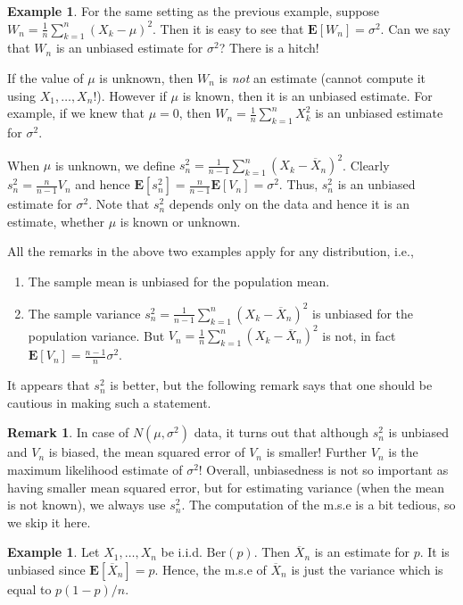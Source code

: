 \documentclass[preprint,  11pt]{amsart}
\theoremstyle{plain} %
\theoremstyle{definition} %
\newtheorem{remark}[theorem]{Remark}
\newtheorem{example}[theorem]{Example}
\begin{document}
\begin{example} For the same setting as the previous example, suppose $W_{n}=\frac{1}{n}\sum_{k=1}^{n}(X_{k}-\mu)^{2}$. Then it is easy to see that $\mathbf{E}[W_{n}]={\sigma}^{2}$. Can we say that $W_{n}$ is an unbiased estimate for ${\sigma}^{2}$? There is a hitch!

If the value of $\mu$ is unknown, then $W_{n}$ is {\em not} an estimate (cannot compute it using $X_{1},\ldots ,X_{n}$!). However if $\mu$ is known, then it is an unbiased estimate. For example, if we knew that $\mu=0$, then $W_{n}=\frac{1}{n}\sum_{k=1}^{n}X_{k}^{2}$ is an unbiased estimate for ${\sigma}^{2}$. 

When $\mu$ is unknown, we define $s_{n}^{2}=\frac{1}{n-1}\sum_{k=1}^{n}(X_{k}-\overline{X}_{n})^{2}$. Clearly $s_{n}^{2}=\frac{n}{n-1}V_{n}$ and hence $\mathbf{E}[s_{n}^{2}]=\frac{n}{n-1}\mathbf{E}[V_{n}]= {\sigma}^{2}$. Thus, $s_{n}^{2}$ is an unbiased estimate for ${\sigma}^{2}$. Note that $s_{n}^{2}$ depends only on the data and hence it is an estimate, whether $\mu$ is known or unknown.
\end{example}
All the remarks in the above two examples apply for any distribution, i.e., 
\begin{enumerate}\setlength\itemsep{6pt}
\item The sample mean is unbiased for the population mean.
\item The sample variance $s_{n}^{2}=\frac{1}{n-1}\sum_{k=1}^{n}(X_{k}-\overline{X}_{n})^{2}$ is unbiased for the population variance. But $V_{n}=\frac{1}{n}\sum_{k=1}^{n}(X_{k}-\overline{X}_{n})^{2}$ is not, in fact $\mathbf{E}[V_{n}]=\frac{n-1}{n}{\sigma}^{2}$.
\end{enumerate}
 It appears that $s_{n}^{2}$ is better, but the following remark says that one should be cautious in making such a statement.
\begin{remark} In case of $N(\mu,{\sigma}^{2})$ data, it turns out that although $s_{n}^{2}$ is unbiased and $V_{n}$ is biased, the mean squared error of $V_{n}$ is smaller! Further $V_{n}$ is the maximum likelihood estimate of ${\sigma}^{2}$! Overall, unbiasedness is not so important as having smaller mean squared error, but for estimating variance (when the mean is not known), we always use $s_{n}^{2}$. The computation of the m.s.e is a bit tedious, so we skip it here.
\end{remark}

\begin{example} Let $X_{1},\ldots ,X_{n}$ be i.i.d. $\mbox{Ber}(p)$. Then $\overline{X}_{n}$ is an estimate for $p$. It is unbiased since $\mathbf{E}[\overline{X}_{n}]=p$. Hence, the m.s.e of $\overline{X}_{n}$ is just the variance which is equal to $p(1-p)/n$.
\end{example}
\end{document}
